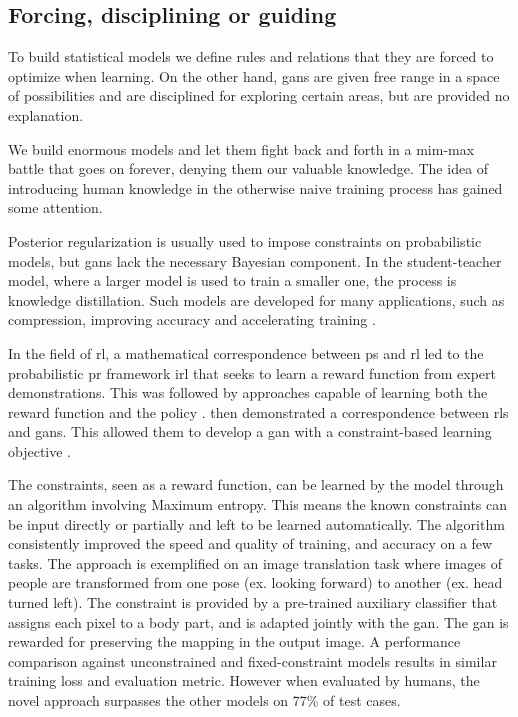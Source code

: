 %
%

\subsection{Forcing, disciplining or guiding \label{sec:knowledge}}

To build statistical models we define rules and relations that they are forced to optimize when learning. On the other hand, \glspl{gan} are given free range in a space of possibilities and are disciplined for exploring certain areas, but are provided no explanation. \par

We build enormous models and let them fight back and forth in a mim-max battle that goes on forever, denying them our valuable knowledge. The idea of introducing human knowledge in the otherwise naive training process has gained some attention.\par

Posterior regularization is usually used to impose constraints on probabilistic models, but \glspl{gan} lack the necessary Bayesian component. In the student-teacher model, where a larger model is used to train a smaller one, the process is knowledge distillation. Such models are developed for many applications, such as compression, improving accuracy and accelerating training \cite{abbasi2019odeling}.

In the field of \gls{rl}, a mathematical correspondence between \gls{ps} and \gls{rl} led to the probabilistic \gls{pr} framework \gls{irl} that seeks to learn a reward function from expert demonstrations. This was followed by approaches capable of learning both the reward function and the policy \cite{finn2016guided,fu2018learning}. \citeauthor{Hu2018} then demonstrated a correspondence between \glspl{rl} and \glspl{gan}. This allowed them to develop a \gls{gan} with a constraint-based learning objective \cite{Hu2018}.\par

The constraints, seen as a reward function, can be learned by the model through an algorithm involving Maximum entropy. This means the known constraints can be input directly or partially and left to be learned automatically. The algorithm consistently improved the speed and quality of training, and accuracy on a few tasks. The approach is exemplified on an image translation task where images of people are transformed from one pose (ex. looking forward) to another (ex. head turned left). The constraint is provided by a pre-trained auxiliary classifier that assigns each pixel to a body part, and is adapted jointly with the \gls{gan}. The \gls{gan} is rewarded for preserving the mapping in the output image. A performance comparison against unconstrained and fixed-constraint models results in similar training loss and evaluation metric. However when evaluated by humans, the novel approach surpasses the other models on 77\% of test cases. \par

